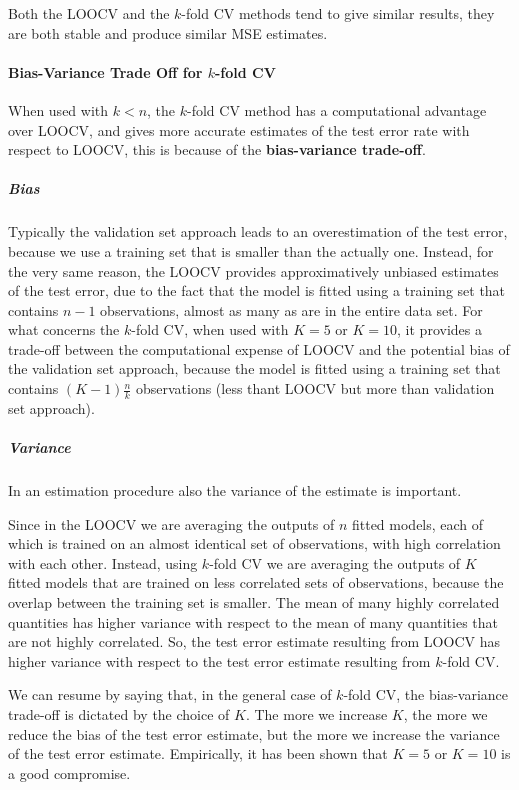 Both the LOOCV and the $k$-fold CV methods tend to give similar results, they are both stable and produce similar MSE estimates.

\paragraph*{Bias-Variance Trade Off for $k$-fold CV}
When used with $k < n$, the $k$-fold CV method has a computational advantage over LOOCV, and gives more accurate estimates of the test error rate with respect to LOOCV, this is because of the \textbf{bias-variance trade-off}.

\subparagraph*{Bias} 
Typically the validation set approach leads to an overestimation of the test error, because we use a training set that is smaller than the actually one. Instead, for the very same reason, the LOOCV provides approximatively unbiased estimates of the test error, due to the fact that the model is fitted using a training set that contains $n-1$ observations, almost as many as are in the entire data set. For what concerns the $k$-fold CV, when used with $K=5$ or $K=10$, it provides a trade-off between the computational expense of LOOCV and the potential bias of the validation set approach, because the model is fitted using a training set that contains $(K-1) \frac{n}{k}$ observations (less thant LOOCV but more than validation set approach).

\subparagraph*{Variance}
In an estimation procedure also the variance of the estimate is important.

Since in the LOOCV we are averaging the outputs of $n$ fitted models, each of which is trained on an almost identical set of observations, with high correlation with each other. Instead, using $k$-fold CV we are averaging the outputs of $K$ fitted models that are trained on less correlated sets of observations, because the overlap between the training set is smaller. The mean of many highly correlated quantities has higher variance with respect to the mean of many quantities that are not highly correlated. So, the test error estimate resulting from LOOCV has higher variance with respect to the test error estimate resulting from $k$-fold CV.

We can resume by saying that, in the general case of $k$-fold CV, the bias-variance trade-off is dictated by the choice of $K$. The more we increase $K$, the more we reduce the bias of the test error estimate, but the more we increase the variance of the test error estimate. Empirically, it has been shown that $K=5$ or $K=10$ is a good compromise.

